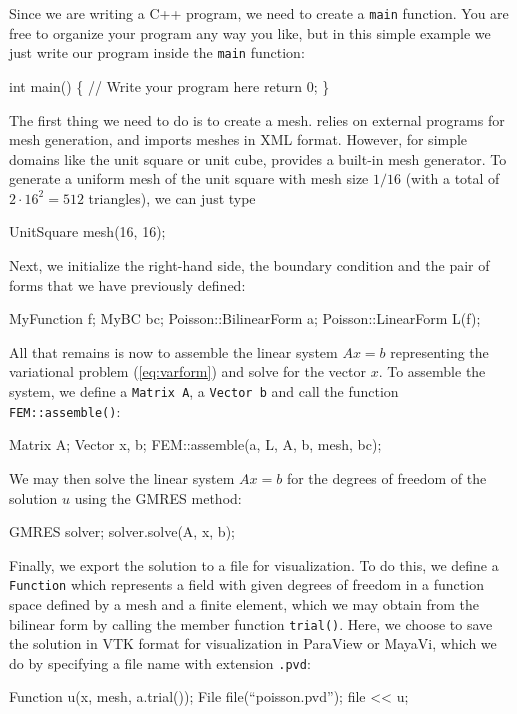 Since we are writing a C++ program, we need to create a \texttt{main}
function.  You are free to organize your program any way you like, but
in this simple example we just write our program inside the
\texttt{main} function:

\begin{code}
  int main()
  \{
    // Write your program here
    return 0;
  \}
\end{code}

The first thing we need to do is to create a mesh. \dolfin{} relies on
external programs for mesh generation, and imports meshes in \dolfin{}
XML format. However, for simple domains like the unit square or unit
cube, \dolfin{} provides a built-in mesh generator. To generate a
uniform mesh of the unit square with mesh size $1/16$ (with a total of
$2\cdot 16^2 = 512$ triangles), we can just type
\begin{code}
  UnitSquare mesh(16, 16);
\end{code}

Next, we initialize the right-hand side, the boundary condition and
the pair of forms that we have previously defined:
\begin{code}
  MyFunction f;
  MyBC bc;
  Poisson::BilinearForm a;
  Poisson::LinearForm L(f);
\end{code}

All that remains is now to assemble the linear system $A x = b$
representing the variational problem (\ref{eq:varform}) and solve for
the vector $x$. To assemble the system, we define a \texttt{Matrix~A},
a \texttt{Vector~b} and call the function \texttt{FEM::assemble()}:
\begin{code}
  Matrix A;
  Vector x, b;
  FEM::assemble(a, L, A, b, mesh, bc);
\end{code}
We may then solve the linear system $A x = b$ for the degrees of
freedom of the solution $u$ using the GMRES method:
\begin{code}
  GMRES solver;
  solver.solve(A, x, b);
\end{code}

Finally, we export the solution to a file for visualization. To do
this, we define a \texttt{Function} which represents a field with
given degrees of freedom in a function space defined by a mesh and a
finite element, which we may obtain from the bilinear form by calling
the member function \texttt{trial()}. Here, we choose to save the
solution in VTK format for visualization in ParaView or MayaVi,
which we do by specifying a file name with extension \texttt{.pvd}:
\begin{code}
  Function u(x, mesh, a.trial());
  File file(``poisson.pvd'');
  file << u;
\end{code}


